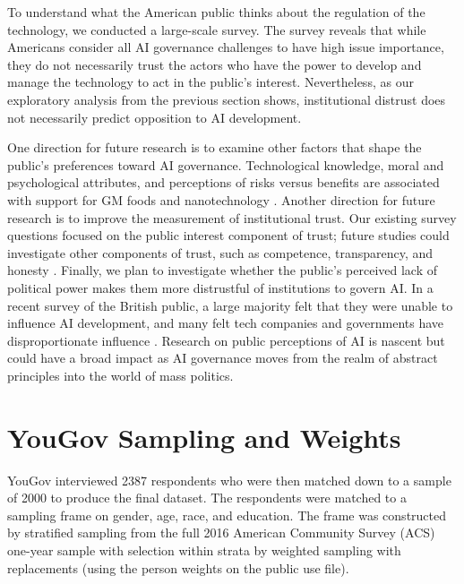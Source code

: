 \documentclass{article}
\begin{document}
To understand what the American public thinks about the regulation of the technology, we conducted a large-scale survey. The survey reveals that while Americans consider all AI governance challenges to have high issue importance, they do not necessarily trust the actors who have the power to develop and manage the technology to act in the public's interest. Nevertheless, as our exploratory analysis from the previous section shows, institutional distrust does not necessarily predict opposition to AI development. 

One direction for future research is to examine other factors that shape the public's preferences toward AI governance. Technological knowledge, moral and psychological attributes, and perceptions of risks versus benefits are associated with support for GM foods and nanotechnology \citep{scott2018overview,satterfield2009anticipating}. Another direction for future research is to improve the measurement of institutional trust. Our existing survey questions focused on the public interest component of trust; future studies could investigate other components of trust, such as competence, transparency, and honesty \citep{lang2005does}. Finally, we plan to investigate whether the public's perceived lack of political power makes them more distrustful of institutions to govern AI. In a recent survey of the British public, a large majority felt that they were unable to influence AI development, and many felt tech companies and governments have disproportionate influence \citep{cave2019scary}. Research on public perceptions of AI is nascent but could have a broad impact as AI governance moves from the realm of abstract principles into the world of mass politics.




\newpage


\appendix


\section{YouGov Sampling and Weights}

YouGov interviewed 2387 respondents who were then matched down to a sample of 2000 to produce the final dataset. The respondents were matched to a sampling frame on gender, age, race, and education. The frame was constructed by stratified sampling from the full 2016 American Community Survey (ACS) one-year sample with selection within strata by weighted sampling with replacements (using the person weights on the public use file).
\end{document}
